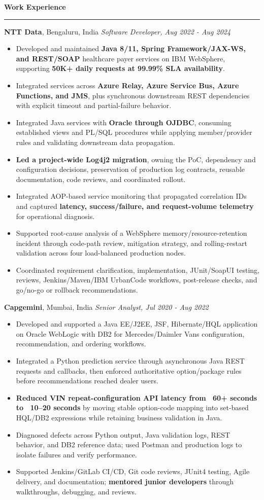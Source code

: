 \documentclass[11pt,letterpaper]{article}
\newcommand{\ressection}[1]{\Needspace{6\baselineskip}\vspace{8pt}\par\textbf{#1}\par\vspace{2pt}\hrule\vspace{5pt}}
\begin{document}
\ressection{Work Experience}
\textbf{NTT Data}, Bengaluru, India \hfill \textit{Software Developer, Aug 2022 - Aug 2024}
\begin{itemize}
  \item Developed and maintained \textbf{Java 8/11, Spring Framework/JAX-WS, and REST/SOAP} healthcare payer services on IBM WebSphere, supporting \textbf{50K+ daily requests at 99.99\% SLA availability}.
  \item Integrated services across \textbf{Azure Relay, Azure Service Bus, Azure Functions, and JMS}, plus synchronous downstream REST dependencies with explicit timeout and partial-failure behavior.
  \item Integrated Java services with \textbf{Oracle through OJDBC}, consuming established views and PL/SQL procedures while applying member/provider rules and validating downstream data propagation.
  \item \textbf{Led a project-wide Log4j2 migration}, owning the PoC, dependency and configuration decisions, preservation of production log contracts, reusable documentation, code reviews, and coordinated rollout.
  \item Integrated AOP-based service monitoring that propagated correlation IDs and captured \textbf{latency, success/failure, and request-volume telemetry} for operational diagnosis.
  \item Supported root-cause analysis of a WebSphere memory/resource-retention incident through code-path review, mitigation strategy, and rolling-restart validation across four load-balanced production nodes.
  \item Coordinated requirement clarification, implementation, JUnit/SoapUI testing, reviews, Jenkins/Maven/IBM UrbanCode workflows, post-release checks, and go/no-go or rollback recommendations.
\end{itemize}
\textbf{Capgemini}, Mumbai, India \hfill \textit{Senior Analyst, Jul 2020 - Aug 2022}
\begin{itemize}
  \item Developed and supported a Java EE/J2EE, JSF, Hibernate/HQL application on Oracle WebLogic with DB2 for Mercedes/Daimler Vans configuration, recommendation, and ordering workflows.
  \item Integrated a Python prediction service through asynchronous Java REST requests and callbacks, then enforced authoritative option/package rules before recommendations reached dealer users.
  \item \textbf{Reduced VIN repeat-configuration API latency from ~60+ seconds to ~10--20 seconds} by moving stable option-code mapping into set-based HQL/DB2 expressions while retaining business validation in Java.
  \item Diagnosed defects across Python output, Java validation logs, REST behavior, and DB2 reference data; used Postman and production logs to isolate failures and verify performance.
  \item Supported Jenkins/GitLab CI/CD, Git code reviews, JUnit4 testing, Agile delivery, and documentation; \textbf{mentored junior developers} through walkthroughs, debugging, and reviews.
\end{itemize}
\end{document}

